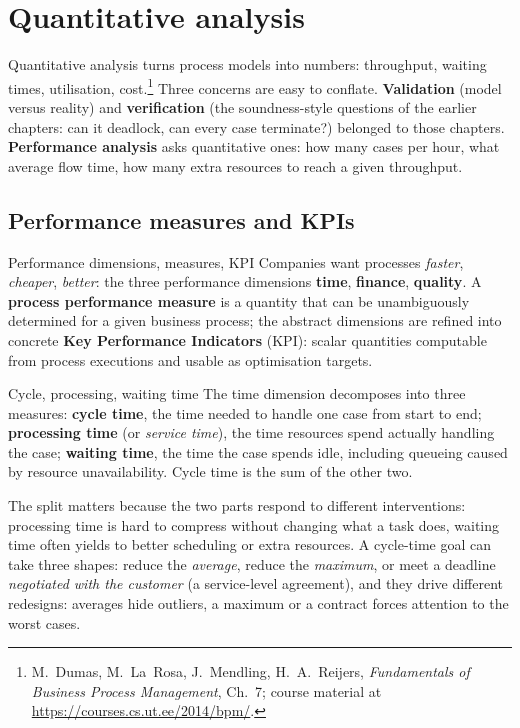 \section{Quantitative analysis}

Quantitative analysis turns process models into numbers: throughput, waiting times, utilisation, cost.\footnote{M.~Dumas, M.~La~Rosa, J.~Mendling, H.~A.~Reijers, \emph{Fundamentals of Business Process Management}, Ch.~7; course material at \url{https://courses.cs.ut.ee/2014/bpm/}.} Three concerns are easy to conflate. \textbf{Validation} (model versus reality) and \textbf{verification} (the soundness-style questions of the earlier chapters: can it deadlock, can every case terminate?) belonged to those chapters. \textbf{Performance analysis} asks quantitative ones: how many cases per hour, what average flow time, how many extra resources to reach a given throughput.

\subsection{Performance measures and KPIs}

\begin{definitionbox}{Performance dimensions, measures, KPI}
Companies want processes \emph{faster}, \emph{cheaper}, \emph{better}: the three performance dimensions \textbf{time}, \textbf{finance}, \textbf{quality}. A \textbf{process performance measure} is a quantity that can be unambiguously determined for a given business process; the abstract dimensions are refined into concrete \textbf{Key Performance Indicators} (KPI): scalar quantities computable from process executions and usable as optimisation targets.
\end{definitionbox}

\begin{definitionbox}{Cycle, processing, waiting time}
The time dimension decomposes into three measures: \textbf{cycle time}, the time needed to handle one case from start to end; \textbf{processing time} (or \emph{service time}), the time resources spend actually handling the case; \textbf{waiting time}, the time the case spends idle, including queueing caused by resource unavailability. Cycle time is the sum of the other two.
\end{definitionbox}
The split matters because the two parts respond to different interventions: processing time is hard to compress without changing what a task does, waiting time often yields to better scheduling or extra resources. A cycle-time goal can take three shapes: reduce the \emph{average}, reduce the \emph{maximum}, or meet a deadline \emph{negotiated with the customer} (a service-level agreement), and they drive different redesigns: averages hide outliers, a maximum or a contract forces attention to the worst cases.

